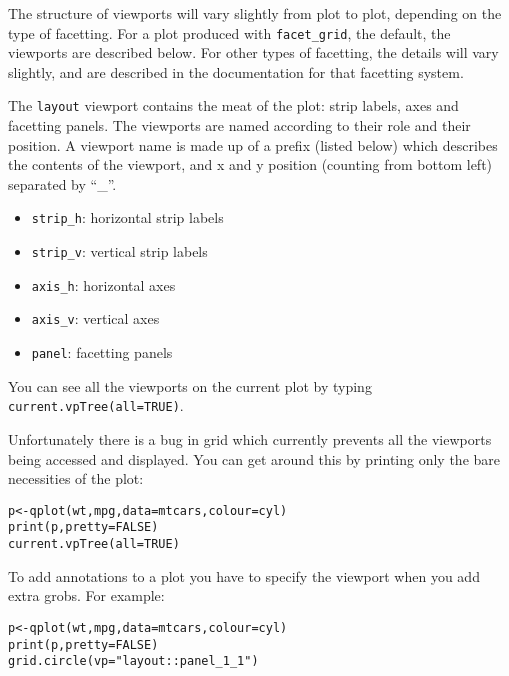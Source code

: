 The structure of viewports will vary slightly from plot to plot, depending on the type of facetting.  For a plot produced with {\tt facet\_grid}, the default, the viewports are described below.  For other types of facetting, the details will vary slightly, and are described in the documentation for that facetting system.  

The {\tt layout} viewport contains the meat of the plot: strip labels, axes and facetting panels.  The viewports are named according to their role and their position.  A viewport name is made up of a prefix (listed below) which describes the contents of the viewport, and x and y position (counting from bottom left) separated by ``\_''.

\begin{itemize}
  \item {\tt strip\_h}: horizontal strip labels
  \item {\tt strip\_v}: vertical strip labels
  \item {\tt axis\_h}: horizontal axes
  \item {\tt axis\_v}: vertical axes
  \item {\tt panel}: facetting panels
\end{itemize}

% 

You can see all the viewports on the current plot by typing {\tt current.vpTree(all=TRUE)}.

\begin{sidebar}
Unfortunately there is a bug in grid which currently prevents all the viewports being accessed and displayed.  You can get around this by printing only the bare necessities of the plot:

\begin{alltt}
p <- qplot(wt, mpg, data=mtcars, colour=cyl)
print(p, pretty = FALSE)
current.vpTree(all=TRUE)
\end{alltt}  

\end{sidebar}

To add annotations to a plot you have to specify the viewport when you add extra grobs.  For example:

\begin{alltt}
p <- qplot(wt, mpg, data=mtcars, colour=cyl)
print(p, pretty=FALSE)
grid.circle(vp="layout::panel_1_1")
\end{alltt}

